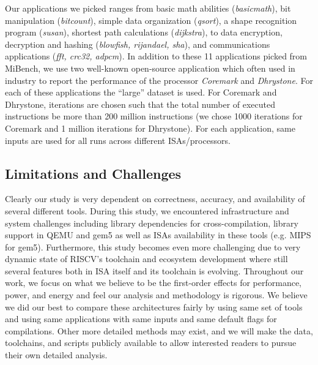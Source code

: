 Our applications we picked ranges from basic math abilities (\textit{basicmath}), bit manipulation (\textit{bitcount}), simple data organization (\textit{qsort}), a shape recognition program (\textit{susan}), shortest path calculations (\textit{dijkstra}), to data encryption, decryption and hashing (\textit{blowfish, rijandael, sha}), and communications applications (\textit{fft, crc32, adpcm}). In addition to these 11 applications picked from MiBench, we use two well-known open-source application which often used in industry to report the performance of the processor \textit{Coremark} and \textit{Dhrystone}. For each of these applications the ``large'' dataset is used. For Coremark and Dhrystone, iterations are chosen such that the total number of executed instructions be more than 200 million instructions (we chose 1000 iterations for Coremark and 1 million iterations for Dhrystone). For each application, same inputs are used for all runs across different ISAs/processors. 

\subsection{Limitations and Challenges}
Clearly our study is very dependent on correctness, accuracy, and availability of several different tools.  During this study, we encountered infrastructure and system challenges including library dependencies for cross-compilation, library support in QEMU and gem5 as well as ISAs availability in these tools (e.g. MIPS for gem5). Furthermore, this study becomes even more challenging due to very dynamic state of RISCV's toolchain and ecosystem development where still several features both in ISA itself and its toolchain is evolving.  Throughout
our work, we focus on what we believe to be the first-order effects for performance,
power, and energy and feel our analysis and methodology is rigorous. We believe we did our best to compare these architectures fairly by using same set of tools and using same applications with same inputs and same default flags for compilations. Other
more detailed methods may exist, and we will make the data, toolchains, and scripts publicly available to allow interested readers to pursue
their own detailed analysis.

   
 
